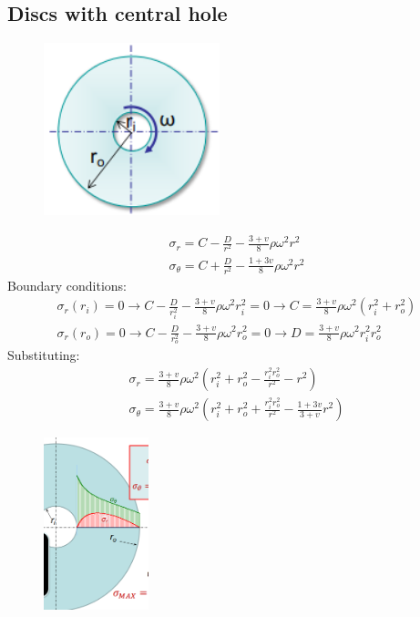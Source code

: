 \documentclass[class=report, crop=false, 12pt,a4paper]{standalone}
\begin{document}
\subsection{Discs with central hole}
\begin{figure}[H]
    \centering
    \includegraphics[height = 5cm]{../img/diagram133.png}
    \caption{}
\end{figure}
\begin{gather}
    \sigma_r = C - \frac{D}{r^2} - \frac{3 + v}{8}\rho \omega^2 r^2\\
    \sigma_{\theta} = C + \frac{D}{r^2} - \frac{1+ 3v}{8}\rho\omega^2 r^2 
\end{gather}
Boundary conditions:
\begin{gather}
    \sigma_r \left(r_i\right) = 0 \rightarrow C - \frac{D}{r_i^2} - \frac{3+v}{8} \rho \omega^2 r_i^2 = 0 \rightarrow C = \frac{3+v}{8} \rho \omega^2 \left(r_i^2 + r_o^2\right)\\
    \sigma_r \left(r_o\right) = 0 \rightarrow C - \frac{D}{r_o^2} - \frac{3+v}{8} \rho \omega^2 r_o^2 = 0 \rightarrow D = \frac{3+v}{8} \rho \omega^2 r_i^2 r_o^2 
\end{gather}
Substituting:
\begin{gather}
    \sigma_r = \frac{3+v}{8} \rho \omega^2 \left(r_i^2 + r_o^2 - \frac{r_i^2 r_o^2}{r^2}-r^2\right)\\
    \sigma_{\theta} = \frac{3+v}{8}\rho \omega^2 \left(r_i^2 + r_o^2 + \frac{r_i^2 r_o^2}{r^2} - \frac{1+3v}{3+v}r^2 \right)
\end{gather}
\begin{figure}[H]
    \centering
    \includegraphics[height = 5cm]{../img/diagram134.png}
    \caption{}
\end{figure}
\end{document}
